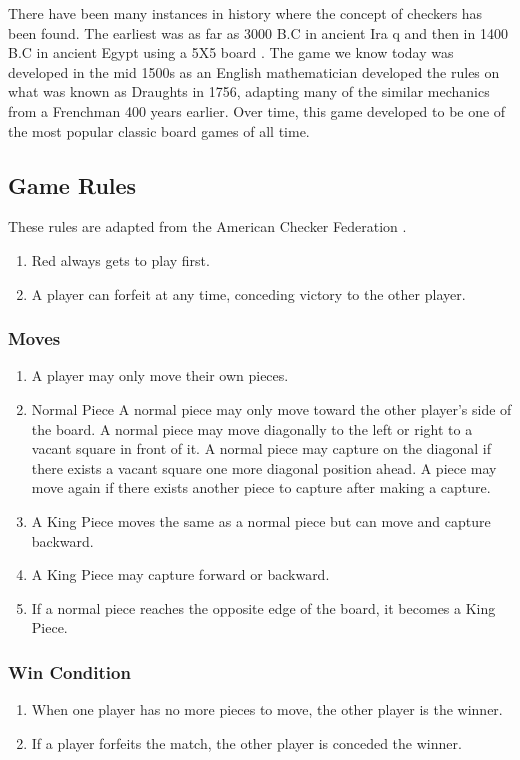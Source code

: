 \documentclass{scrreprt}
\begin{document}
There have been many instances in history where the concept of checkers has been found. The earliest was as far as 3000 B.C
in ancient Ira	q and then in 1400 B.C in ancient Egypt using a 5X5 board \cite{historyCheckers}. 
The game we know today was developed in the mid 1500s as an English mathematician developed the rules on what was known as Draughts in 1756, adapting many of the similar mechanics from a Frenchman 400 years earlier. Over time, this game developed to be one of the most popular classic board games of all time.

\subsection{Game Rules}
	These rules are adapted from the American Checker Federation \cite {checkersFoundation}.
	\begin{enumerate}
	\item Red always gets to play first.
	\item A player can forfeit at any time, conceding victory to the other player.
	\end{enumerate}
\subsubsection{Moves} 
\begin{enumerate}
    \item A player may only move their own pieces.
    \item Normal Piece
        \subitem A normal piece may only move toward the other player's side of the board.
        \subitem A normal piece may move diagonally to the left or right to a vacant square in front of it.
        \subitem A normal piece may capture on the diagonal if there exists a vacant square one more diagonal position ahead.
            \subsubitem A piece may move again if there exists another piece to capture after making a capture.
    \item A King Piece moves the same as a normal piece but can move and capture backward.
    \item A King Piece may capture forward or backward.
    \item If a normal piece reaches the opposite edge of the board, it becomes a King Piece.
\end{enumerate}

\subsubsection{Win Condition}
\begin{enumerate}
    \item When one player has no more pieces to move, the other player is the winner.
    \item If a player forfeits the match, the other player is conceded the winner.
\end{enumerate}
\end{document}
